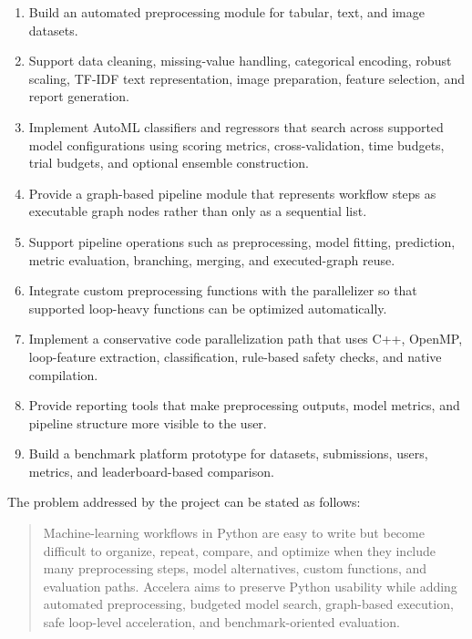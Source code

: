\documentclass[12pt,a4paper]{report}
\begin{document}
\begin{enumerate}
  \item Build an automated preprocessing module for tabular, text, and image
  datasets.

  \item Support data cleaning, missing-value handling, categorical encoding,
  robust scaling, TF-IDF text representation, image preparation, feature
  selection, and report generation.

  \item Implement AutoML classifiers and regressors that search across supported
  model configurations using scoring metrics, cross-validation, time budgets,
  trial budgets, and optional ensemble construction.

  \item Provide a graph-based pipeline module that represents workflow steps as
  executable graph nodes rather than only as a sequential list.

  \item Support pipeline operations such as preprocessing, model fitting,
  prediction, metric evaluation, branching, merging, and executed-graph reuse.

  \item Integrate custom preprocessing functions with the parallelizer so that
  supported loop-heavy functions can be optimized automatically.

  \item Implement a conservative code parallelization path that uses C++,
  OpenMP, loop-feature extraction, classification, rule-based safety checks, and
  native compilation.

  \item Provide reporting tools that make preprocessing outputs, model metrics,
  and pipeline structure more visible to the user.

  \item Build a benchmark platform prototype for datasets, submissions, users,
  metrics, and leaderboard-based comparison.
\end{enumerate}

The problem addressed by the project can be stated as follows:

\begin{quote}
Machine-learning workflows in Python are easy to write but become difficult to
organize, repeat, compare, and optimize when they include many preprocessing
steps, model alternatives, custom functions, and evaluation paths. Accelera aims
to preserve Python usability while adding automated preprocessing, budgeted
model search, graph-based execution, safe loop-level acceleration, and
benchmark-oriented evaluation.
\end{quote}
\end{document}
